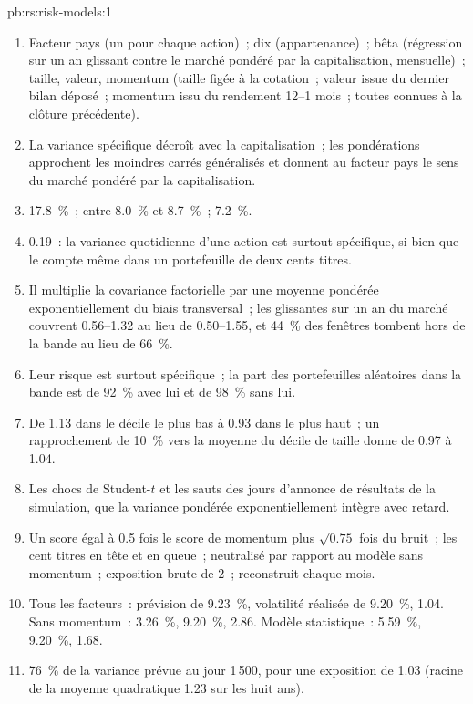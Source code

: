 \begin{solution}{pb:rs:risk-models:1}
\begin{enumerate}
\item Facteur pays (un pour chaque action)~; dix  (appartenance)~; bêta (régression sur un an glissant contre le marché pondéré par la capitalisation, mensuelle)~; taille, valeur, momentum (taille figée à la cotation~; valeur issue du dernier bilan déposé~; momentum issu du rendement 12--1 mois~; toutes connues à la clôture précédente).
\item La variance spécifique décroît avec la capitalisation~; les pondérations approchent les moindres carrés généralisés et donnent au facteur pays le sens du marché pondéré par la capitalisation.
\item 17.8~\%~; entre 8.0~\% et 8.7~\%~; 7.2~\%.
\item 0.19~: la variance quotidienne d'une action est surtout spécifique, si bien que le  compte même dans un portefeuille de deux cents titres.
\item Il multiplie la covariance factorielle par une moyenne pondérée exponentiellement du biais transversal~; les  glissantes sur un an du marché couvrent
0.56--1.32 au lieu de 0.50--1.55, et 44~\% des fenêtres tombent hors de la bande au lieu de 66~\%.
\item Leur risque est surtout spécifique~; la part des portefeuilles aléatoires dans la bande est de 92~\% avec lui et de 98~\% sans lui.
\item De 1.13 dans le décile le plus bas à 0.93 dans le plus haut~; un rapprochement de 10~\% vers la moyenne du décile de taille donne de 0.97 à 1.04.
\item Les chocs de Student-$t$ et les sauts des jours d'annonce de résultats de la simulation, que la variance pondérée exponentiellement intègre avec retard.
\item Un score égal à 0.5 fois le score de momentum plus $\sqrt{0.75}$ fois du bruit~; les cent titres en tête et en queue~; neutralisé par rapport au modèle sans momentum~;
exposition brute de 2~; reconstruit chaque mois.
\item Tous les facteurs~: prévision de 9.23~\%, volatilité réalisée de 9.20~\%,  1.04. Sans momentum~: 3.26~\%, 9.20~\%, 2.86. Modèle statistique~: 5.59~\%, 9.20~\%, 1.68.
\item 76~\% de la variance prévue au jour 1\,500, pour une exposition de 1.03 (racine de la moyenne quadratique 1.23 sur les huit ans).

\end{enumerate}
\end{solution}
